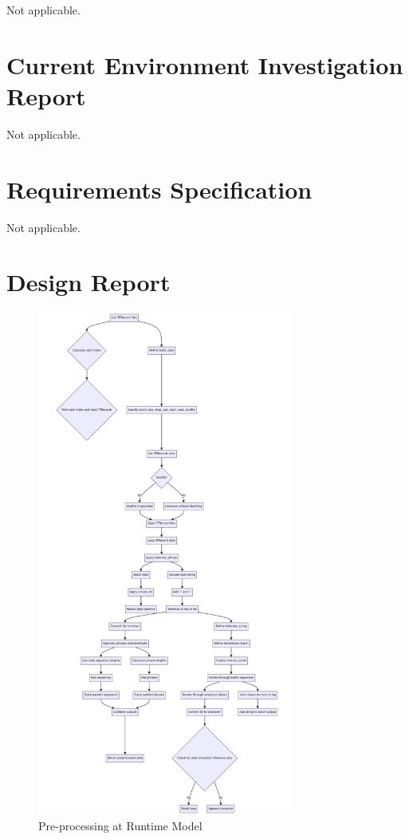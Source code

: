 \documentclass[preprint,11pt,review,authoryear]{elsarticle}
\begin{document}
Not applicable.
\newpage
\section{Current Environment Investigation Report} \label{D}
\renewcommand{\thepage}{D\arabic{page}}

Not applicable.
\newpage
\section{Requirements Specification} \label{E}
\renewcommand{\thepage}{E\arabic{page}}
Not applicable.
\newpage
\section{Design Report} \label{F}
\renewcommand{\thepage}{F\arabic{page}}
\begin{figure}
    \centering
    \includegraphics[width=0.75\textwidth]{images/pp_runtime_v5.png}
    \caption{Pre-processing at Runtime Model}
    \label{fig:pp_runtime}
\end{figure}
\end{document}
